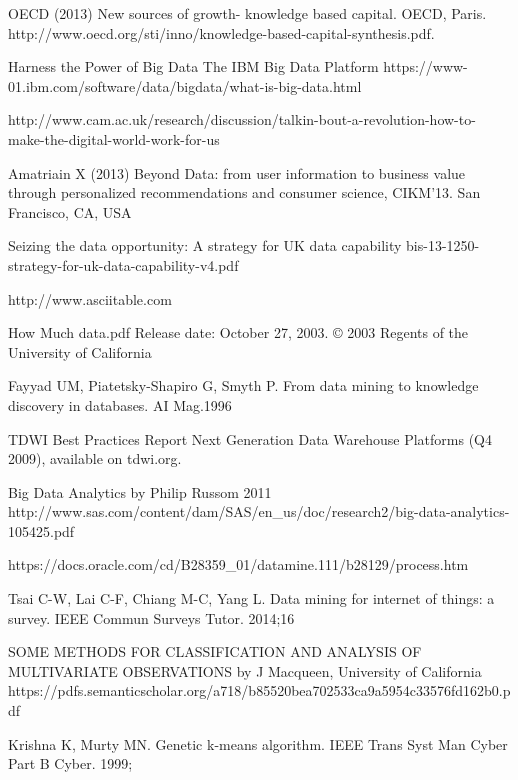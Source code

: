\documentclass[10pt,journal,compsoc]{IEEEtran}
\begin{document}
\begin{thebibliography}{1}

OECD (2013) New sources of growth- knowledge based capital. OECD, Paris. 
http://www.oecd.org/sti/inno/knowledge-based-capital-synthesis.pdf.

Harness the Power of Big Data The IBM Big Data Platform
https://www-01.ibm.com/software/data/bigdata/what-is-big-data.html

http://www.cam.ac.uk/research/discussion/talkin-bout-a-revolution-how-to-make-the-digital-world-work-for-us

Amatriain X (2013) Beyond Data: from user information to business value through personalized recommendations
and consumer science, CIKM’13. San Francisco, CA, USA

Seizing the data opportunity: A strategy for UK data capability
bis-13-1250-strategy-for-uk-data-capability-v4.pdf

http://www.asciitable.com

How Much data.pdf
Release date: October 27, 2003. © 2003 Regents of the University of California

Fayyad UM, Piatetsky-Shapiro G, Smyth P. From data mining to knowledge discovery in databases. AI Mag.1996

TDWI Best Practices Report Next Generation Data Warehouse Platforms (Q4 2009), available on tdwi.org.

Big Data Analytics by Philip Russom 2011
http://www.sas.com/content/dam/SAS/en\_us/doc/research2/big-data-analytics-105425.pdf

https://docs.oracle.com/cd/B28359\_01/datamine.111/b28129/process.htm

Tsai C-W, Lai C-F, Chiang M-C, Yang L. Data mining for internet of things: a survey. IEEE Commun Surveys Tutor.
2014;16

SOME METHODS FOR CLASSIFICATION AND ANALYSIS OF MULTIVARIATE OBSERVATIONS by J Macqueen, University of California
https://pdfs.semanticscholar.org/a718/b85520bea702533ca9a5954c33576fd162b0.pdf

Krishna K, Murty MN. Genetic k-means algorithm. IEEE Trans Syst Man Cyber Part B Cyber. 1999;

\end{thebibliography}
\end{document}
